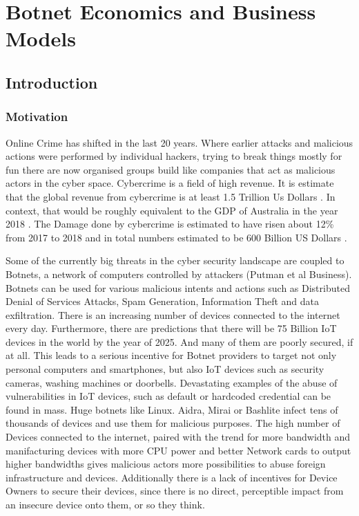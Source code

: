 \chapter{Botnet Economics and Business Models}


\newpage

\minitoc %

\newpage

\section{Introduction}

\subsection{Motivation}
Online Crime has shifted in the last 20 years. Where earlier attacks and malicious actions were performed by individual hackers, trying to break things mostly for fun there are now organised groups build like companies that act as malicious actors in the cyber space.
Cybercrime is a field of high revenue. It is estimate that the global revenue from cybercrime is at least 1.5 Trillion Us Dollars \cite{McGuire18}. In context, that would be roughly equivalent to the GDP of Australia in the year 2018 \cite{Worldbank19}. 
The Damage done by cybercrime is estimated to have risen about 12\% from 2017 to 2018 \cite{Accenture17} and in total numbers estimated to be 600 Billion US Dollars \cite{McAfee18}. 

Some of the currently big threats in the cyber security landscape are coupled to Botnets, a network of computers controlled by attackers (Putman et al Business). Botnets can be used for various malicious intents and actions such as Distributed Denial of Services Attacks, Spam Generation, Information Theft and data exfiltration. 
There is an increasing number of devices connected to the internet every day. Furthermore, there are predictions that there will be 75 Billion IoT devices in the world by the year of 2025. 
And many of them are poorly secured, if at all. This leads to a serious incentive for Botnet providers to target not only personal computers and smartphones, but also IoT devices such as security cameras, washing machines or doorbells. Devastating examples of the abuse of vulnerabilities in IoT devices, such as default or hardcoded credential can be found in mass. Huge botnets like Linux. Aidra, Mirai or Bashlite infect tens of thousands of devices and use them for malicious purposes.   
The high number of Devices connected to the internet, paired with the trend for more bandwidth and manifacturing devices with more CPU power and better Network cards to output higher bandwidths gives malicious actors more possibilities to abuse foreign infrastructure and devices. 
Additionally there is a lack of incentives for Device Owners to secure their devices, since there is no direct, perceptible impact from an insecure device onto them, or so they think. 

